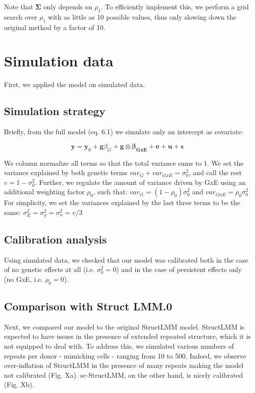 Note that $\boldsymbol{\Sigma}$ only depends on $\rho_1$. 
To efficiently implement this, we perform a grid search over $\rho_1$ with as little as 10 possible values, thus only slowing down the original method by a factor of 10.

\newpage

\section{Simulation data}

First, we applied the model on simulated data.

\subsection{Simulation strategy}
Briefly, from the full model (eq. 6.1) we simulate only an intercept as covariate:  

\begin{equation}
 \mathbf{y} = \mathbf{y}_0 + \mathbf{g}\beta_G + \mathbf{g} \otimes \boldsymbol{\beta_{GxE}} + \mathbf{e} + \mathbf{u} + \boldsymbol{\epsilon} 
\end{equation}

We column normalize all terms so that the total variance sums to 1.
We set the variance explained by both genetic terms $var_G+var_{GxE}=\sigma_0^2$, and call the rest $v = 1-\sigma_0^2$.
Further, we regulate the amount of variance driven by GxE using an additional weighting factor $\rho_0$, such that: $var_G = (1-\rho_0)\sigma_0^2$ and $var_{GxE} = \rho_0\sigma_0^2$
For simplicity, we set the variances explained by the last three terms to be the same:
$\sigma_E^2 = \sigma_g^2 = \sigma_n^2 = v/3$

\subsection{Calibration analysis}

Using simulated data, we checked that our model was calibrated both in the case of no genetic effects at all (i.e. $\sigma_0^2 = 0$) and in the case of persistent effects only (no GxE, i.e. $\rho_0 = 0$).

\subsection{Comparison with Struct LMM.0}

Next, we compared our model to the original StructLMM model.
StructLMM is expected to have issues in the presence of extended repeated structure, which it is not equipped to deal with.
To address this, we simulated various numbers of repeats per donor - mimicking cells -  ranging from 10 to 500.
Indeed, we observe over-inflation of StructLMM in the presence of many repeats making the model not calibrated (Fig. Xa).
sc-StructLMM, on the other hand, is nicely calibrated (Fig. Xb).

